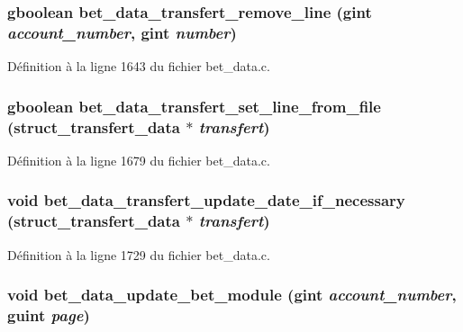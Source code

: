 \subsubsection[{bet\_\-data\_\-transfert\_\-remove\_\-line}]{\setlength{\rightskip}{0pt plus 5cm}gboolean bet\_\-data\_\-transfert\_\-remove\_\-line (gint {\em account\_\-number}, \/  gint {\em number})}\label{bet__data_8c_a96f2da14ad123bdaca6976f33481166c}


Définition à la ligne 1643 du fichier bet\_\-data.c.

\subsubsection[{bet\_\-data\_\-transfert\_\-set\_\-line\_\-from\_\-file}]{\setlength{\rightskip}{0pt plus 5cm}gboolean bet\_\-data\_\-transfert\_\-set\_\-line\_\-from\_\-file ({\bf struct\_\-transfert\_\-data} $\ast$ {\em transfert})}\label{bet__data_8c_aa39d707af5ab5b7827ca29e9d4cd4d5c}


Définition à la ligne 1679 du fichier bet\_\-data.c.

\subsubsection[{bet\_\-data\_\-transfert\_\-update\_\-date\_\-if\_\-necessary}]{\setlength{\rightskip}{0pt plus 5cm}void bet\_\-data\_\-transfert\_\-update\_\-date\_\-if\_\-necessary ({\bf struct\_\-transfert\_\-data} $\ast$ {\em transfert})}\label{bet__data_8c_aaab5591eff8b758d7d53b3cc0e94f102}


Définition à la ligne 1729 du fichier bet\_\-data.c.

\subsubsection[{bet\_\-data\_\-update\_\-bet\_\-module}]{\setlength{\rightskip}{0pt plus 5cm}void bet\_\-data\_\-update\_\-bet\_\-module (gint {\em account\_\-number}, \/  guint {\em page})}\label{bet__data_8c_af0bc501a6a7a255f8adc9500328c950f}


